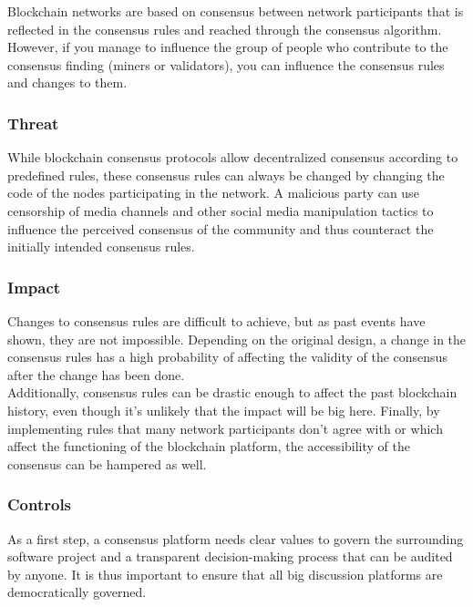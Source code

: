 \documentclass[11pt,a4paper,draft]{article}
\begin{document}
Blockchain networks are based on consensus between network participants that is reflected in the consensus rules and reached through the consensus algorithm. However, if you manage to influence the group of people who contribute to the consensus finding (miners or validators), you can influence the consensus rules and changes to them.\\

\subsubsection{Threat}

While blockchain consensus protocols allow decentralized consensus according to predefined rules, these consensus rules can always be changed by changing the code of the nodes participating in the network. A malicious party can use censorship of media channels and other social media manipulation tactics to influence the perceived consensus of the community and thus counteract the initially intended consensus rules.\\

\subsubsection{Impact}

Changes to consensus rules are difficult to achieve, but as past events have shown, they are not impossible. Depending on the original design, a change in the consensus rules has a high probability of affecting the validity of the consensus after the change has been done.\\

Additionally, consensus rules can be drastic enough to affect the past blockchain history, even though it's unlikely that the impact will be big here. Finally, by implementing rules that many network participants don't agree with or which affect the functioning of the blockchain platform, the accessibility of the consensus can be hampered as well.\\

\subsubsection{Controls}

As a first step, a consensus platform needs clear values to govern the surrounding software project and a transparent decision-making process that can be audited by anyone. It is thus important to ensure that all big discussion platforms are democratically governed.\\
\end{document}
